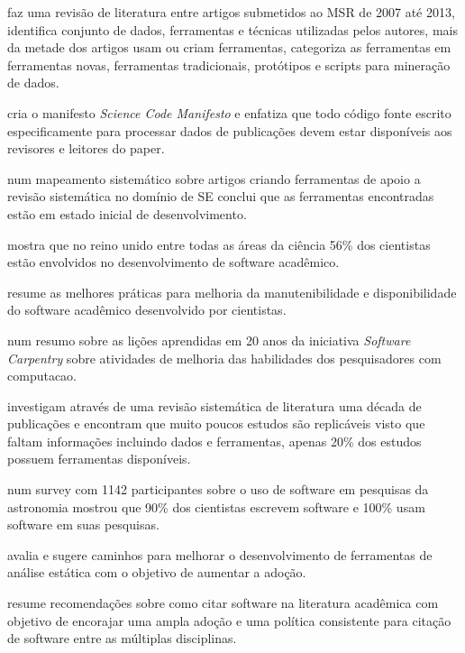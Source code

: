 faz uma revisão de literatura entre artigos submetidos ao MSR de 2007 até 2013,
identifica conjunto de dados, ferramentas e técnicas utilizadas pelos autores,
mais da metade dos artigos usam ou criam ferramentas, categoriza as ferramentas
em ferramentas novas, ferramentas tradicionais, protótipos e scripts para
mineração de dados.

cria o manifesto {\it Science Code Manifesto} e enfatiza que todo código fonte
escrito especificamente para processar dados de publicações devem estar
disponíveis aos revisores e leitores do paper.

 num mapeamento sistemático sobre artigos criando
ferramentas de apoio a revisão sistemática no domínio de SE conclui que as
ferramentas encontradas estão em estado inicial de desenvolvimento.

 mostra que no reino unido entre todas as áreas da
ciência 56\% dos cientistas estão envolvidos no desenvolvimento de software
acadêmico.

 resume as melhores práticas para melhoria da
manutenibilidade e disponibilidade do software acadêmico desenvolvido por
cientistas.

 num resumo sobre as lições aprendidas em 20
anos da iniciativa {\it Software Carpentry} sobre atividades de melhoria das
habilidades dos pesquisadores com computacao.

investigam através de uma revisão sistemática de literatura uma década de
publicações e encontram que muito poucos estudos são replicáveis visto que
faltam informações incluindo dados e ferramentas, apenas 20\% dos estudos
possuem ferramentas disponíveis.

num survey com 1142 participantes sobre o uso de software em pesquisas da
astronomia mostrou que 90\% dos cientistas escrevem software e 100\% usam
software em suas pesquisas.

 avalia e sugere caminhos para melhorar o
desenvolvimento de ferramentas de análise estática com o objetivo de aumentar a
adoção.

 resume recomendações sobre como citar software
na literatura acadêmica com objetivo de encorajar uma ampla adoção e uma
política consistente para citação de software entre as múltiplas disciplinas.

